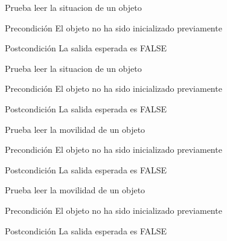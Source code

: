 \begin{DoxyRefList}
\item[\label{test__test000200}%
\hypertarget{test__test000200}{}%
Global \hyperlink{object__test_8c_a979585252ddcb56e24411bc3553da84d}{test2\-\_\-object\-\_\-\-Get\-\_\-\-Illuminates} ()]Prueba leer la situacion de un objeto \begin{DoxyPrecond}{Precondición}
El objeto no ha sido inicializado previamente 
\end{DoxyPrecond}
\begin{DoxyPostcond}{Postcondición}
La salida esperada es F\-A\-L\-S\-E  
\end{DoxyPostcond}

\item[\label{test__test000202}%
\hypertarget{test__test000202}{}%
Global \hyperlink{object__test_8c_a194698b8928e15bd4327503af7a75ad7}{test2\-\_\-object\-\_\-\-Get\-\_\-\-Light} ()]Prueba leer la situacion de un objeto \begin{DoxyPrecond}{Precondición}
El objeto no ha sido inicializado previamente 
\end{DoxyPrecond}
\begin{DoxyPostcond}{Postcondición}
La salida esperada es F\-A\-L\-S\-E  
\end{DoxyPostcond}

\item[\label{test__test000192}%
\hypertarget{test__test000192}{}%
Global \hyperlink{object__test_8c_a06e6d27222478b6bc41d9f7123347c61}{test2\-\_\-object\-\_\-\-Get\-\_\-\-Mobile} ()]Prueba leer la movilidad de un objeto \begin{DoxyPrecond}{Precondición}
El objeto no ha sido inicializado previamente 
\end{DoxyPrecond}
\begin{DoxyPostcond}{Postcondición}
La salida esperada es F\-A\-L\-S\-E  
\end{DoxyPostcond}

\item[\label{test__test000194}%
\hypertarget{test__test000194}{}%
Global \hyperlink{object__test_8c_a61f4b87aef3ac6b5b49fa097e95e01be}{test2\-\_\-object\-\_\-\-Get\-\_\-\-Moved} ()]Prueba leer la movilidad de un objeto \begin{DoxyPrecond}{Precondición}
El objeto no ha sido inicializado previamente 
\end{DoxyPrecond}
\begin{DoxyPostcond}{Postcondición}
La salida esperada es F\-A\-L\-S\-E  
\end{DoxyPostcond}


\end{DoxyRefList}
